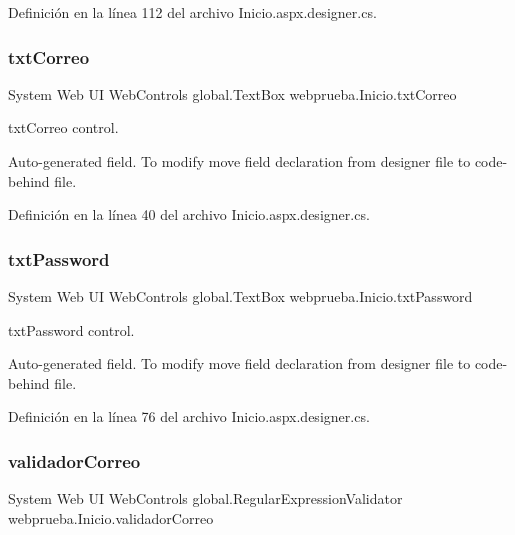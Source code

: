 Definición en la línea 112 del archivo Inicio.\+aspx.\+designer.\+cs.

\mbox{\label{classwebprueba_1_1_inicio_ae3b3a310c1ddb8c2c2498daf2004ebd0}} 
\subsubsection{\texorpdfstring{txtCorreo}{txtCorreo}}
{\footnotesize\ttfamily System Web UI Web\+Controls global.\+Text\+Box webprueba.\+Inicio.\+txt\+Correo\hspace{0.3cm}{\ttfamily [protected]}}



txt\+Correo control. 

Auto-\/generated field. To modify move field declaration from designer file to code-\/behind file. 

Definición en la línea 40 del archivo Inicio.\+aspx.\+designer.\+cs.

\mbox{\label{classwebprueba_1_1_inicio_ae729ab398507e57d56602498e15acc69}} 
\subsubsection{\texorpdfstring{txtPassword}{txtPassword}}
{\footnotesize\ttfamily System Web UI Web\+Controls global.\+Text\+Box webprueba.\+Inicio.\+txt\+Password\hspace{0.3cm}{\ttfamily [protected]}}



txt\+Password control. 

Auto-\/generated field. To modify move field declaration from designer file to code-\/behind file. 

Definición en la línea 76 del archivo Inicio.\+aspx.\+designer.\+cs.

\mbox{\label{classwebprueba_1_1_inicio_a37542bf07283e9a8fa7640c3ca969749}} 
\subsubsection{\texorpdfstring{validadorCorreo}{validadorCorreo}}
{\footnotesize\ttfamily System Web UI Web\+Controls global.\+Regular\+Expression\+Validator webprueba.\+Inicio.\+validador\+Correo\hspace{0.3cm}{\ttfamily [protected]}}



